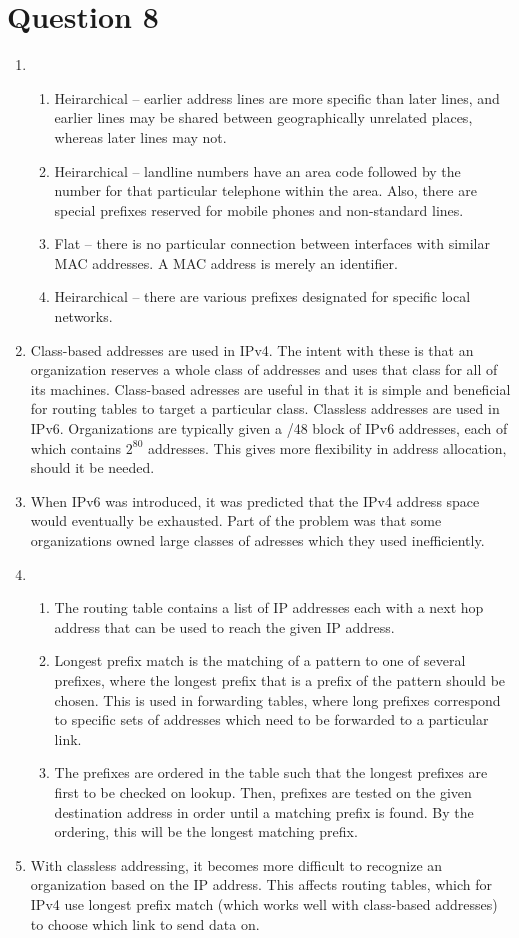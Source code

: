 \documentclass{article}
\begin{document}
\section*{Question 8}
\begin{enumerate}
  \item
    \begin{enumerate}
      \item Heirarchical -- earlier address lines are more specific than later lines, and earlier lines may be shared between geographically unrelated places, whereas later lines may not.
      \item Heirarchical -- landline numbers have an area code followed by the number for that particular telephone within the area. Also, there are special prefixes reserved for mobile phones and non-standard lines.
      \item Flat -- there is no particular connection between interfaces with similar MAC addresses. A MAC address is merely an identifier.
      \item Heirarchical -- there are various prefixes designated for specific local networks.
    \end{enumerate}
  \item Class-based addresses are used in IPv4. The intent with these is that an organization reserves a whole class of addresses and uses that class for all of its machines. Class-based adresses are useful in that it is simple and beneficial for routing tables to target a particular class. Classless addresses are used in IPv6. Organizations are typically given a /48 block of IPv6 addresses, each of which contains $2^{80}$ addresses. This gives more flexibility in address allocation, should it be needed.
  \item When IPv6 was introduced, it was predicted that the IPv4 address space would eventually be exhausted. Part of the problem was that some organizations owned large classes of adresses which they used inefficiently.
  \item
    \begin{enumerate}
      \item The routing table contains a list of IP addresses each with a next hop address that can be used to reach the given IP address.
      \item Longest prefix match is the matching of a pattern to one of several prefixes, where the longest prefix that is a prefix of the pattern should be chosen. This is used in forwarding tables, where long prefixes correspond to specific sets of addresses which need to be forwarded to a particular link.
      \item The prefixes are ordered in the table such that the longest prefixes are first to be checked on lookup. Then, prefixes are tested on the given destination address in order until a matching prefix is found. By the ordering, this will be the longest matching prefix.
    \end{enumerate}
  \item With classless addressing, it becomes more difficult to recognize an organization based on the IP address. This affects routing tables, which for IPv4 use longest prefix match (which works well with class-based addresses) to choose which link to send data on.
\end{enumerate}
\end{document}
